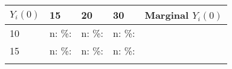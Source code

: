 \documentclass[]{article}
\begin{document}
\begin{longtable}[]{@{}lllll@{}}
\toprule
\begin{minipage}[b]{0.19\columnwidth}\raggedright
\(Y_{i}(0)\)\strut
\end{minipage} & \begin{minipage}[b]{0.06\columnwidth}\raggedright
15\strut
\end{minipage} & \begin{minipage}[b]{0.06\columnwidth}\raggedright
20\strut
\end{minipage} & \begin{minipage}[b]{0.06\columnwidth}\raggedright
30\strut
\end{minipage} & \begin{minipage}[b]{0.32\columnwidth}\raggedright
Marginal \(Y_{i}(0)\)\strut
\end{minipage}\tabularnewline
\midrule
\endhead
\begin{minipage}[t]{0.19\columnwidth}\raggedright
10\strut
\end{minipage} & \begin{minipage}[t]{0.06\columnwidth}\raggedright
n: \%:\strut
\end{minipage} & \begin{minipage}[t]{0.06\columnwidth}\raggedright
n: \%:\strut
\end{minipage} & \begin{minipage}[t]{0.06\columnwidth}\raggedright
n: \%:\strut
\end{minipage} & \begin{minipage}[t]{0.32\columnwidth}\raggedright
\strut
\end{minipage}\tabularnewline
\begin{minipage}[t]{0.19\columnwidth}\raggedright
15\strut
\end{minipage} & \begin{minipage}[t]{0.06\columnwidth}\raggedright
n: \%:\strut
\end{minipage} & \begin{minipage}[t]{0.06\columnwidth}\raggedright
n: \%:\strut
\end{minipage} & \begin{minipage}[t]{0.06\columnwidth}\raggedright
n: \%:\strut
\end{minipage} & \begin{minipage}[t]{0.32\columnwidth}\raggedright
\strut
\end{minipage}\tabularnewline
\begin{minipage}[t]{0.19\columnwidth}\raggedright

\end{minipage}
\end{longtable}
\end{document}
